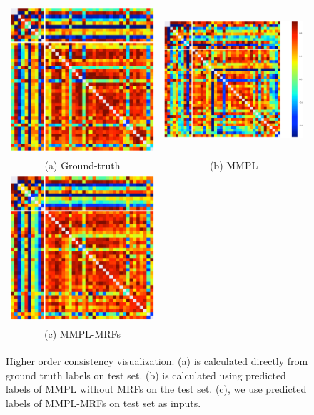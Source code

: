 \begin{figure}[t]
  \centering
  \setlength{\tabcolsep}{20pt}
  \begin{tabular}{cc}
  \includegraphics[width=0.4\columnwidth]{Part2/figures/gt.png}&
\includegraphics[width=0.48\columnwidth]{Part2/figures/mmpl.png}\\
{\small (a) Ground-truth} & {\small (b) MMPL }\\
    \includegraphics[width=0.4\columnwidth]{Part2/figures/mrf.png}\\
{\small (c) MMPL-MRFs}\\
  \end{tabular}
  \caption{\label{fig:consistency} Higher order consistency
    visualization. (a) is calculated
    directly from ground truth labels on test set.
    (b)
    is calculated using predicted labels of MMPL without MRFs on the
    test set.
    (c), we use predicted labels of
    MMPL-MRFs on test set as inputs.}
\end{figure}

